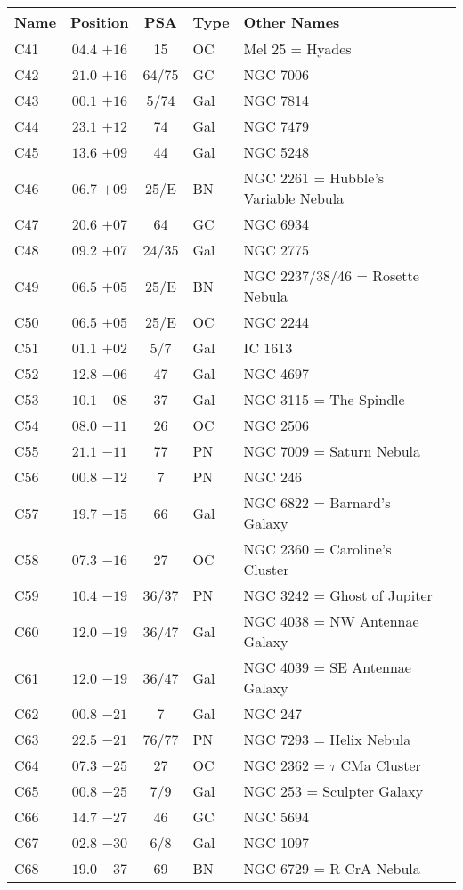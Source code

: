 \begin{table}[p]
\setlength{\tabcolsep}{2pt}
\small
\begin{tabular}{lcclll}
\hline
Name&Position&PSA&Type&Other Names\\
\hline
C41  &$04.4$ $+16$&15&OC &Mel 25 = Hyades\\
C42  &$21.0$ $+16$&64/75&GC &NGC 7006\\
C43  &$00.1$ $+16$&5/74&Gal&NGC 7814\\
C44  &$23.1$ $+12$&74&Gal&NGC 7479\\
C45  &$13.6$ $+09$&44&Gal&NGC 5248\\
C46  &$06.7$ $+09$&25/E&BN &NGC 2261 = Hubble's Variable Nebula\\
C47  &$20.6$ $+07$&64&GC &NGC 6934\\
C48  &$09.2$ $+07$&24/35&Gal&NGC 2775\\
C49  &$06.5$ $+05$&25/E&BN &NGC 2237/38/46 = Rosette Nebula\\
C50  &$06.5$ $+05$&25/E&OC &NGC 2244\\
C51  &$01.1$ $+02$&5/7&Gal&IC 1613\\
C52  &$12.8$ $-06$&47&Gal&NGC 4697\\
C53  &$10.1$ $-08$&37&Gal&NGC 3115 = The Spindle\\
C54  &$08.0$ $-11$&26&OC &NGC 2506\\
C55  &$21.1$ $-11$&77&PN &NGC 7009 = Saturn Nebula\\
C56  &$00.8$ $-12$&7&PN &NGC 246\\
C57  &$19.7$ $-15$&66&Gal&NGC 6822 = Barnard's Galaxy\\
C58  &$07.3$ $-16$&27&OC &NGC 2360 = Caroline's Cluster\\
C59  &$10.4$ $-19$&36/37&PN &NGC 3242 = Ghost of Jupiter\\
C60  &$12.0$ $-19$&36/47&Gal&NGC 4038 = NW Antennae Galaxy\\
C61  &$12.0$ $-19$&36/47&Gal&NGC 4039 = SE Antennae Galaxy\\
C62  &$00.8$ $-21$&7&Gal&NGC 247\\
C63  &$22.5$ $-21$&76/77&PN &NGC 7293 = Helix Nebula\\
C64  &$07.3$ $-25$&27&OC &NGC 2362 = $\tau$ CMa Cluster\\
C65  &$00.8$ $-25$&7/9&Gal&NGC 253 = Sculpter Galaxy\\
C66  &$14.7$ $-27$&46&GC &NGC 5694\\
C67  &$02.8$ $-30$&6/8&Gal&NGC 1097\\
C68  &$19.0$ $-37$&69&BN &NGC 6729 = R CrA Nebula\\

\end{tabular}
\end{table}
